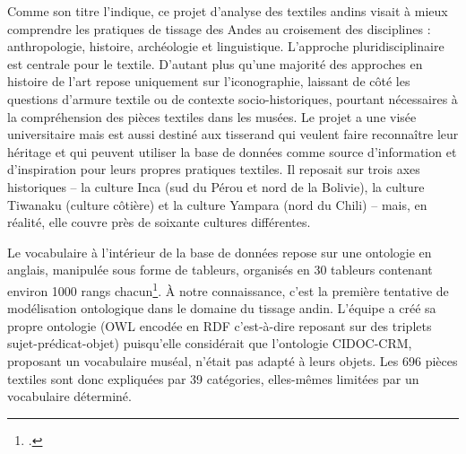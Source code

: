 Comme son titre l'indique, ce projet d'analyse des textiles andins visait à mieux comprendre les pratiques de tissage des Andes au croisement des disciplines : anthropologie, histoire, archéologie et linguistique. L'approche pluridisciplinaire est centrale pour le textile. D'autant plus qu'une majorité des approches en histoire de l'art repose uniquement sur l'iconographie, laissant de côté les questions d'armure textile ou de contexte socio-historiques, pourtant nécessaires à la compréhension des pièces textiles dans les musées. Le projet a une visée universitaire mais est aussi destiné aux tisserand qui veulent faire reconnaître leur héritage et qui peuvent utiliser la base de données comme source d'information et d'inspiration pour leurs propres pratiques textiles. Il reposait sur trois axes historiques -- la culture Inca (sud du Pérou et nord de la Bolivie), la culture Tiwanaku (culture côtière) et la culture Yampara (nord du Chili) -- mais, en réalité, elle couvre près de soixante cultures différentes.

Le vocabulaire à l'intérieur de la base de données repose sur une ontologie en anglais, manipulée sous forme de tableurs, organisés en 30 tableurs contenant environ 1000 rangs chacun\footcite[p.~7]{brownlowOntologicalApproachCreating2015}. À notre connaissance, c'est la première tentative de modélisation ontologique dans le domaine du tissage andin. L'équipe a créé sa propre ontologie (OWL encodée en RDF c'est-à-dire reposant sur des triplets sujet-prédicat-objet) puisqu'elle considérait que l'ontologie CIDOC-CRM, proposant un vocabulaire muséal, n'était pas adapté à leurs objets. Les 696 pièces textiles sont donc expliquées par 39 catégories, elles-mêmes limitées par un vocabulaire déterminé.


